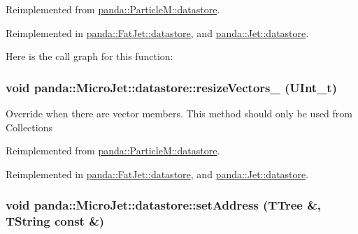 Reimplemented from \hyperlink{structpanda_1_1ParticleM_1_1datastore_ad6986990fa55f1c6ca4e92db28486922}{panda::ParticleM::datastore}.

Reimplemented in \hyperlink{structpanda_1_1FatJet_1_1datastore_a8dd1a45fedb7d5ec627601b23f0dc2d5}{panda::FatJet::datastore}, and \hyperlink{structpanda_1_1Jet_1_1datastore_ae6ac289071c894912c7a60cdd224509f}{panda::Jet::datastore}.

Here is the call graph for this function:\hypertarget{structpanda_1_1MicroJet_1_1datastore_a9570f85bfad7f55e239670d0f364cb8b}{
\subsubsection[{resizeVectors\_\-}]{\setlength{\rightskip}{0pt plus 5cm}void panda::MicroJet::datastore::resizeVectors\_\- (UInt\_\-t)}}
\label{structpanda_1_1MicroJet_1_1datastore_a9570f85bfad7f55e239670d0f364cb8b}


Override when there are vector members. This method should only be used from Collections 

Reimplemented from \hyperlink{structpanda_1_1ParticleM_1_1datastore_a6dd61d4a8f70e81a1638757a5edbc7ed}{panda::ParticleM::datastore}.

Reimplemented in \hyperlink{structpanda_1_1FatJet_1_1datastore_ac707315048c1fe184534202259fbdda9}{panda::FatJet::datastore}, and \hyperlink{structpanda_1_1Jet_1_1datastore_a8de9fbcd55c17f7d3d022088f6ded487}{panda::Jet::datastore}.\hypertarget{structpanda_1_1MicroJet_1_1datastore_a475b19becb4a39eb0248e8b9c785feb3}{
\subsubsection[{setAddress}]{\setlength{\rightskip}{0pt plus 5cm}void panda::MicroJet::datastore::setAddress (TTree \&, \/  TString const \&)}}
\label{structpanda_1_1MicroJet_1_1datastore_a475b19becb4a39eb0248e8b9c785feb3}



